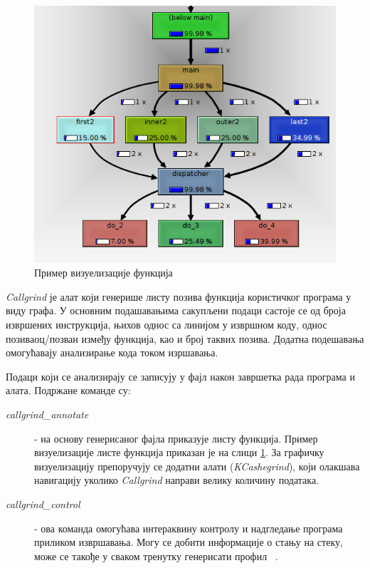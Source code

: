 \documentclass[12pt,oneside]{memoir}
\begin{document}
\begin{figure}[h!]
\begin{center}
\includegraphics[scale=0.75]{slika18.png}
\end{center}
\caption{Пример визуелизације функција}
\label{fig:callgrind}
\end{figure}

\indent \textit{Callgrind} је алат који генерише листу позива функција користичког програма у виду графа. У основним подашавањима сакупљени подаци састоје се од броја извршених инструкција, њихов однос са линијом у извршном коду, однос позиваоц/позван између функција, као и број таквих позива. Додатна подешавања омогућавају анализирање кода током изршавања. 

\indent Подаци који се анализирају се записују у фајл након завршетка рада програма и алата. Подржане команде су:

\begin{description}
	\item[\textit{callgrind\_annotate}] - на основу генерисаног фајла приказује листу функција. Пример визуелизације листе функција приказан је на слици \ref{fig:callgrind}. За графичку визуелизацију препоручују се додатни алати (\textit{KCashegrind}), који олакшава навигацију уколико \textit{Callgrind} направи велику количину података.
	\item[\textit{callgrind\_control}] - ова команда омогућава интераквину контролу и надгледање програма приликом извршавања. Могу се добити информације о стању на стеку, може се такође у сваком тренутку генерисати профил ~\cite{callgrindRef}. 
\end{description}
\end{document}
